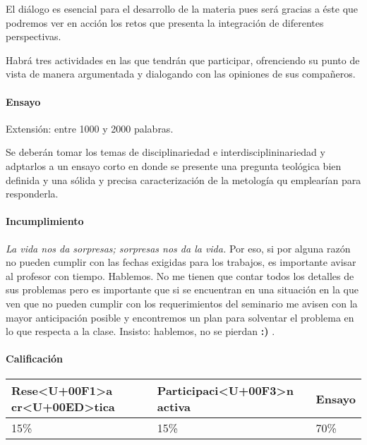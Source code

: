 \documentclass[spanish,]{article}
\let\oldparagraph\paragraph
\renewcommand{\paragraph}[1]{\oldparagraph{#1}\mbox{}}
\begin{document}
El diálogo es esencial para el desarrollo de la materia pues será
gracias a éste que podremos ver en acción los retos que presenta la
integración de diferentes perspectivas.

Habrá tres actividades en las que tendrán que participar, ofrenciendo su
punto de vista de manera argumentada y dialogando con las opiniones de
sus compañeros.

\paragraph{\texorpdfstring{\textbf{Ensayo}}{Ensayo}}\label{ensayo}

Extensión: entre 1000 y 2000 palabras.

Se deberán tomar los temas de disciplinariedad e interdisciplininariedad
y adptarlos a un ensayo corto en donde se presente una pregunta
teológica bien definida y una sólida y precisa caracterización de la
metología qu emplearían para responderla.

\paragraph{\texorpdfstring{\textbf{Incumplimiento}}{Incumplimiento}}\label{incumplimiento}

\emph{La vida nos da sorpresas; sorpresas nos da la vida.} Por eso, si
por alguna razón no pueden cumplir con las fechas exigidas para los
trabajos, es importante avisar al profesor con tiempo. Hablemos. No me
tienen que contar todos los detalles de sus problemas pero es importante
que si se encuentran en una situación en la que ven que no pueden
cumplir con los requerimientos del seminario me avisen con la mayor
anticipación posible y encontremos un plan para solventar el problema en
lo que respecta a la clase. Insisto: hablemos, no se pierdan \textbf{:)}
.

\paragraph{\texorpdfstring{\textbf{Calificación}}{Calificación}}\label{calificaciuxf3n}

\begin{tabular}{l|l|l}
\hline
Rese<U+00F1>a cr<U+00ED>tica & Participaci<U+00F3>n activa & Ensayo\\
\hline
15\% & 15\% & 70\%\\
\hline
\end{tabular}
\end{document}

